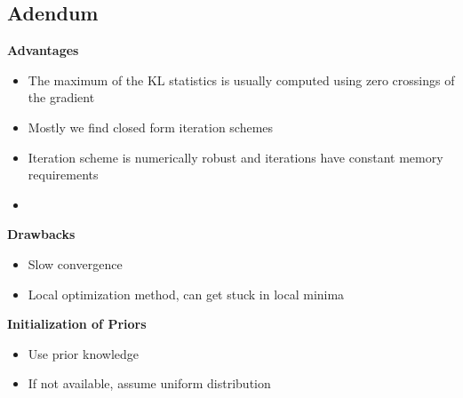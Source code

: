\subsection*{Adendum}
\textbf{Advantages}
\begin{itemize}
    \item
        The maximum of the KL statistics is usually computed using zero crossings of the gradient
    \item
        Mostly we find closed form iteration schemes
    \item
        Iteration scheme is numerically robust and iterations have constant memory requirements
    \item
\end{itemize}
\textbf{Drawbacks}
\begin{itemize}
    \item
        Slow convergence
    \item
        Local optimization method, can get stuck in local minima
\end{itemize}
\textbf{Initialization of Priors}
\begin{itemize}
    \item
        Use prior knowledge
    \item
        If not available, assume uniform distribution
\end{itemize}

